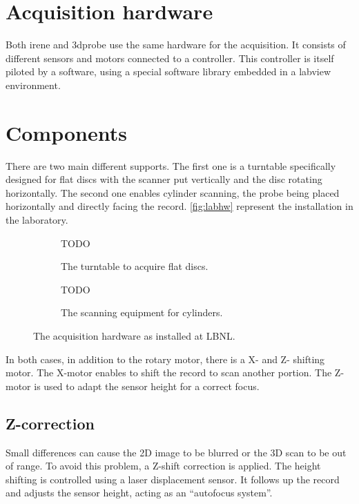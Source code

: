 \section{Acquisition hardware}

Both \gls{irene} and \gls{3dprobe} use the same hardware for the acquisition. It consists of different sensors and motors connected to a controller. This controller is itself piloted by a software, using a special software library embedded in a \gls{labview} environment.

\section{Components}

There are two main different supports. The first one is a turntable specifically designed for flat discs with the scanner put vertically and the disc rotating horizontally. The second one enables cylinder scanning, the probe being placed horizontally and directly facing the record. \autoref{fig:labhw} represent the installation in the laboratory.

\begin{figure}[!ht]
    \begin{subfigure}[b]{0.49\textwidth}
    \centering
    TODO
    \caption{The turntable to acquire flat discs.}
    \label{fig:labirene}
    \end{subfigure}
    \begin{subfigure}[b]{0.49\textwidth}
    \centering
    TODO
    \caption{The scanning equipment for cylinders.}
    \label{fig:lab3d}
    \end{subfigure}
    \caption{The acquisition hardware as installed at LBNL.}
    \label{fig:labhw}
\end{figure}

In both cases, in addition to the rotary motor, there is a X- and Z- shifting motor. The X-motor enables to shift the record to scan another portion. The Z-motor is used to adapt the sensor height for a correct focus.

\subsection{Z-correction}

Small differences can cause the 2D image to be blurred or the 3D scan to be out of range. To avoid this problem, a Z-shift correction is applied. The height shifting is controlled using a laser displacement sensor. It follows up the record and adjusts the sensor height, acting as an ``autofocus system''.

